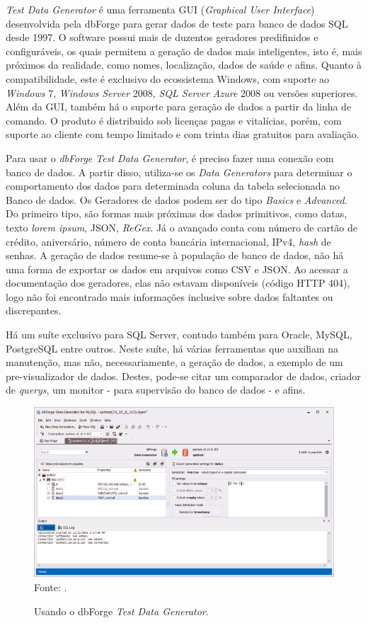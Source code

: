 \documentclass[
	12pt,				%
	openright,			%
	oneside,			%
	a4paper,			%
	english,			%
	brazil				%
	]{abntex2}
\begin{document}
		\emph{Test Data Generator} \cite{forgeDBDataGenerator} é uma ferramenta GUI (\emph{Graphical User Interface}) desenvolvida pela dbForge para gerar dados de teste para banco de dados SQL desde 1997.
		O software possui mais de duzentos geradores predifinidos e configuráveis, os quais permitem a geração de dados mais inteligentes, isto é, mais próximos da realidade, como nomes, localização, dados de saúde e afins.
		Quanto à compatibilidade, este é exclusivo do ecossistema Windows, com suporte ao \emph{Windows} 7, \emph{Windows Server} 2008, \emph{SQL Server Azure} 2008 ou versões superiores. 
		Além da GUI, também há o suporte para geração de dados a partir da linha de comando.
		O produto é distribuido sob licenças pagas e vitalícias, porém, com suporte ao cliente com tempo limitado e com trinta dias gratuitos para avaliação.
		\par
		Para usar o \emph{dbForge Test Data Generator}, é preciso fazer uma conexão com banco de dados. 
		A partir disso, utiliza-se os \emph{Data Generators} para determinar o comportamento dos dados para determinada coluna da tabela selecionada no Banco de dados.
		Os Geradores de dados podem ser do tipo \emph{Basics} e \emph{Advanced}. 
		Do primeiro tipo, são formas mais próximas dos dados primitivos, como datas, texto \emph{lorem ipsum}, JSON, \emph{ReGex}.
		Já o avançado conta com número de cartão de crédito, aniversário, número de conta bancária internacional, IPv4, \emph{hash} de senhas.  
		A geração de dados resume-se à população de banco de dados, não há uma forma de exportar os dados em arquivos como CSV e JSON.
		Ao acessar a documentação \cite{forgeDBDataGeneratorDoc} dos geradores, elas não estavam disponíveis (código HTTP 404), logo não foi encontrado mais informações inclusive sobre dados faltantes ou discrepantes.
		\par
		Há um suíte exclusivo para SQL Server, contudo também para Oracle, MySQL, PostgreSQL entre outros.
		Neste suíte, há várias ferramentas que auxiliam na manutenção, mas não, necessariamente, a geração de dados, a exemplo de um pre-visualizador de dados.
		Destes, pode-se citar um comparador de dados, criador de \emph{querys}, um monitor - para supervisão do banco de dados - e afins.
		\begin{figure}[h]
			\centering
			\caption{Usando o dbForge \emph{Test Data Generator}.}
			\includegraphics[width=\linewidth]{./figures/TrabalhosRelacionados/dbForge-Test-Data-Generator.jpg}
			\label{fig:dbForgeTDG}
			\footnotesize Fonte: \cite{forgeDBDataGenerator}.
		\end{figure}
\end{document}
